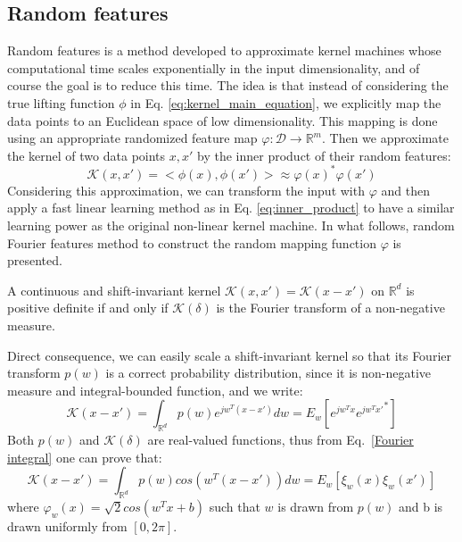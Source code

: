 \subsection{Random features}
Random features is a method developed to approximate kernel machines whose computational time  scales exponentially in the input dimensionality, and of course the goal is to reduce this time.   The idea is that instead of considering the true lifting function $\phi$ in Eq. \ref{eq:kernel_main_equation}, we explicitly map the data points to an Euclidean space of low dimensionality. This mapping is done using an appropriate randomized feature map $\varphi:\mathcal{D} \xrightarrow{}\mathbb{R}^m$. Then we approximate the kernel of two data points $x, x'$ by the inner product of their random features:
\begin{equation}
\label{eq:approx_RF}
\mathcal{K}(x,x')=<\phi(x),\phi(x')> \approx \varphi(x)^*\varphi(x')
\end{equation}
Considering this approximation, we can transform the input with $\varphi$ and then apply a fast linear learning method as in Eq. \ref{eq:inner_product} to have a similar learning power as the original non-linear kernel machine. In what follows, random Fourier features method to construct the random mapping function $\varphi$ is presented.
\begin{theorem}
A continuous and shift-invariant kernel $\mathcal{K}(x,x')=\mathcal{K}(x-x')$ on $\mathbb{R}^d$ is positive definite if and only if $\mathcal{K}(\delta)$ is the Fourier transform of a non-negative measure.
\end{theorem}
Direct consequence, we can easily scale a shift-invariant kernel so that its Fourier transform $p(w)$ is a correct probability distribution, since it is non-negative measure and integral-bounded function, and we write:
\begin{equation}
\label{Fourier integral}
\mathcal{K}(x-x')=\int_{\mathbb{R}^d}p(w)e^{jw^T(x-x')}dw=E_w[e^{jw^Tx}{e^{jw^Tx'}}^*]
\end{equation}
Both $p(w)$ and $\mathcal{K}(\delta)$ are real-valued functions, thus from Eq.~\ref{Fourier integral} one can prove that:
\begin{equation}
\label{real Fourier integral}
\mathcal{K}(x-x')=\int_{\mathbb{R}^d}p(w)cos({w^T(x-x')})dw=E_w[\xi_w(x)\xi_w(x')]
\end{equation}
where $\varphi_w(x)=\sqrt{2}cos(w^Tx+b)$ such that $w$ is drawn from $p(w)$ and b is drawn uniformly from $[0,2\pi]$.\newline

